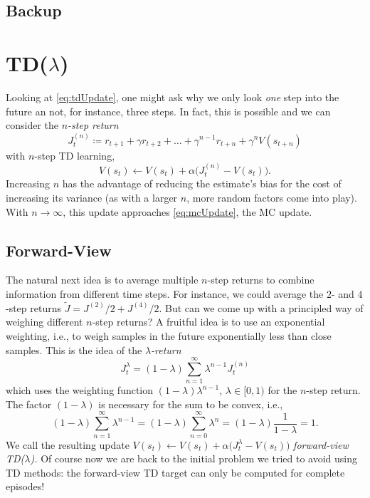 		\subsection{Backup}

	\section{\acs{TD}(\(\lambda\))}
		\label{sec:tdLambda}

		Looking at \eqref{eq:tdUpdate}, one might ask why we only look \emph{one} step into the future an not, for instance, three steps. In fact, this is possible and we can consider the \emph{\(n\)-step return}
		\begin{equation}
			J_t^{(n)} \coloneqq r_{t + 1} + \gamma r_{t + 2} + \dots + \gamma^{n - 1} r_{t + n} + \gamma^n V(s_{t + n})
		\end{equation}
		with \(n\)-step \ac{TD} learning,
		\begin{equation}
			V(s_t) \gets V(s_t) + \alpha \bigl( J_t^{(n)} - V(s_t) \bigr).
		\end{equation}
		Increasing \(n\) has the advantage of reducing the estimate's bias for the cost of increasing its variance (as with a larger \(n\), more random factors come into play). With \(n \to \infty\), this update approaches \eqref{eq:mcUpdate}, the \ac{MC} update.

		\subsection{Forward-View}
			The natural next idea is to average multiple \(n\)-step returns to combine information from different time steps. For instance, we could average the \(2\)- and \(4\)-step returns \( \tilde{J} = J^{(2)}/2 + J^{(4)}/2 \). But can we come up with a principled way of weighing different \(n\)-step returns? A fruitful idea is to use an exponential weighting, i.e., to weigh samples in the future exponentially less than close samples. This is the idea of the \emph{\(\lambda\)-return}
			\begin{equation}
				J_t^\lambda = (1 - \lambda) \sum_{n = 1}^{\infty} \lambda^{n - 1} J_t^{(n)}
			\end{equation}
			which uses the weighting function \( (1 - \lambda) \lambda^{n - 1} \), \( \lambda \in [0, 1) \) for the \(n\)-step return. The factor \((1 - \lambda)\) is necessary for the sum to be convex, i.e.,
			\begin{equation}
				(1 - \lambda) \sum_{n = 1}^{\infty} \lambda^{n - 1}
					= (1 - \lambda) \sum_{n = 0}^{\infty} \lambda^n
					= (1 - \lambda) \frac{1}{1 - \lambda}
					= 1.
			\end{equation}
			We call the resulting update \( V(s_t) \gets V(s_t) + \alpha \bigl( J_t^\lambda - V(s_t) \bigr) \) \emph{forward-view TD(\(\lambda\)).} Of course now we are back to the initial problem we tried to avoid using \ac{TD} methods: the forward-view \ac{TD} target can only be computed for complete episodes!

